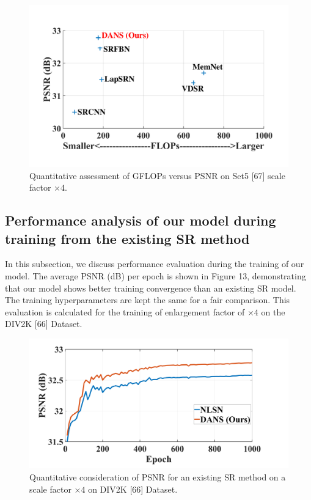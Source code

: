 \documentclass{ieeeaccess}
\begin{document}
\begin{figure}[ht]
  \includegraphics[width=\linewidth]{12FIGURE.pdf}
  \caption{Quantitative assessment of GFLOPs versus PSNR on Set5 [67] scale factor $\times4$.}
  \label{fig:12}
\end{figure}


\subsection{Performance  analysis of our model during training from the existing SR method}
In this subsection, we discuss performance evaluation during the training of our model. The average PSNR (dB) per epoch is shown in Figure 13, demonstrating that our model shows better training convergence than an existing SR model. The training hyperparameters are kept the same for a fair comparison. This evaluation is calculated for the training of enlargement factor of $\times4$ on the DIV2K [66] Dataset.


\begin{figure}[ht]
  \includegraphics[width=\linewidth]{13FIGURE.pdf}
  \caption{Quantitative consideration of PSNR for an existing SR method on a scale factor $\times4$ on DIV2K [66] Dataset.}
  \label{fig:13}
\end{figure}
\end{document}
